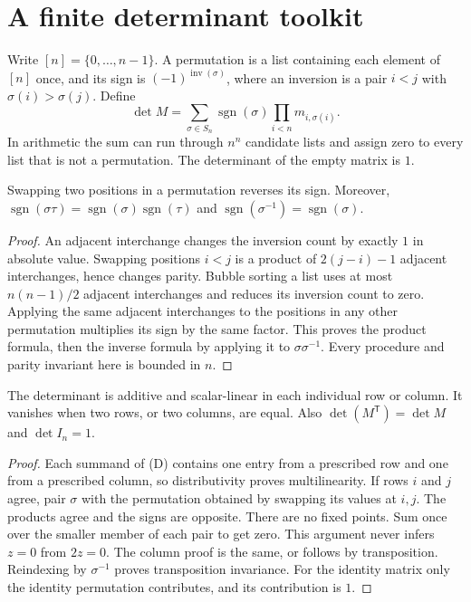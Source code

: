 \section{A finite determinant toolkit}
\label{sec:determinants}

Write $[n]=\{0,\ldots,n-1\}$. A permutation is a list containing each
element of $[n]$ once, and its sign is $(-1)^{\operatorname{inv}(\sigma)}$,
where an inversion is a pair $i<j$ with $\sigma(i)>\sigma(j)$. Define
\[
 \det M=\sum_{\sigma\in S_n}\operatorname{sgn}(\sigma)
                              \prod_{i<n}m_{i,\sigma(i)}.
 \tag{D}
\]
In arithmetic the sum can run through $n^n$ candidate lists and assign
zero to every list that is not a permutation. The determinant of the
empty matrix is $1$.

\begin{lemma}
Swapping two positions in a permutation reverses its sign. Moreover,
$\operatorname{sgn}(\sigma\tau)=\operatorname{sgn}(\sigma)
\operatorname{sgn}(\tau)$ and
$\operatorname{sgn}(\sigma^{-1})=\operatorname{sgn}(\sigma)$.
\end{lemma}
\begin{proof}
An adjacent interchange changes the inversion count by exactly $1$ in
absolute value. Swapping positions $i<j$ is a product of
$2(j-i)-1$ adjacent interchanges, hence changes parity. Bubble sorting a
list uses at most $n(n-1)/2$ adjacent interchanges and reduces its
inversion count to zero. Applying the same adjacent interchanges to
the positions in any other permutation multiplies its sign by the same
factor. This proves the product formula, then the inverse formula by
applying it to $\sigma\sigma^{-1}$. Every procedure and parity invariant
here is bounded in $n$.
\end{proof}

\begin{lemma}
The determinant is additive and scalar-linear in each individual row or
column. It vanishes when two rows, or two columns, are equal.
Also $\det(M^{\mathsf T})=\det M$ and $\det I_n=1$.
\end{lemma}
\begin{proof}
Each summand of (D) contains one entry from a prescribed row and one
from a prescribed column, so distributivity proves multilinearity.
If rows $i$ and $j$ agree, pair $\sigma$ with the permutation obtained by
swapping its values at $i,j$. The products agree and the signs are
opposite. There are no fixed points. Sum once over the smaller member
of each pair to get zero. This argument never infers $z=0$ from $2z=0$.
The column proof is the same, or follows by transposition. Reindexing
by $\sigma^{-1}$ proves transposition invariance. For the identity matrix
only the identity permutation contributes, and its contribution is $1$.
\end{proof}

